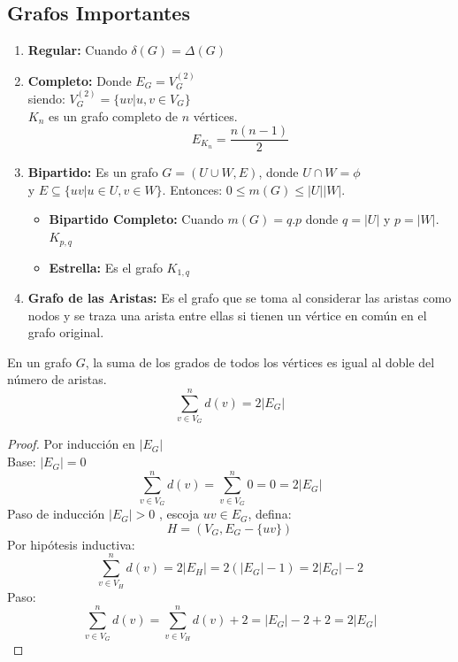 \subsection{Grafos Importantes}
\begin{enumerate}
\item {\bf Regular:} Cuando $\delta(G)=\Delta(G)$
\item {\bf Completo:} Donde $E_G=V_G^{(2)}$ \\
siendo: $V_G^{(2)}=\{uv|u,v \in V_G\}$ \\
\notacion $K_n$ es un grafo completo de $n$ vértices.
$$E_{K_n}=\frac{n(n-1)}{2}$$


\item {\bf Bipartido:}
Es un grafo $G=(U\cup W,E)$, donde $U\cap W=\phi$\\
y $E\subseteq \{uv|u\in U, v\in W\}$. Entonces: $0\leq m(G)\leq|U||W|$.

\begin{itemize}
\item {\bf Bipartido Completo:}
Cuando $m(G)=q.p$ donde $q=|U|$ y $p=|W|$.\\
\notacion $K_{p,q}$

\item {\bf Estrella:}
Es el grafo $K_{1,q}$

\end{itemize}

\item {\bf Grafo de las Aristas:}
Es el grafo que se toma al considerar las aristas como nodos y se traza una arista entre ellas si tienen un vértice en común en el grafo original.


\end{enumerate}
\begin{teorema}
\label{teoconex}
En un grafo $G$, la suma de los grados de todos los vértices es igual
al doble del número de aristas.
$$\sum_{v\in {V_G}}^n{d(v)} = {2|E_G|}$$
\end{teorema}
\begin{proof}
Por inducción en $|E_G|$ \\
Base: $|E_G|=0$
$$\sum_{v\in {V_G}}^n{d(v)} = \sum_{v\in {V_G}}^n0 = 0 = 2|E_G|$$
Paso de inducción $|E_G|>0$ , escoja $uv \in E_G$, defina: 
$$H=(V_G,E_G-\{uv\})$$
Por hipótesis inductiva:
$$\sum_{v\in {V_H}}^n{d(v)} = 2|E_H| = 2(|E_G|-1) = 2|E_G|-2$$
Paso:
$$\sum_{v\in {V_G}}^n{d(v)} = \sum_{v\in {V_H}}^n{d(v)}+2 = |E_G|-2+2 = 2|E_G|$$
\end{proof}

